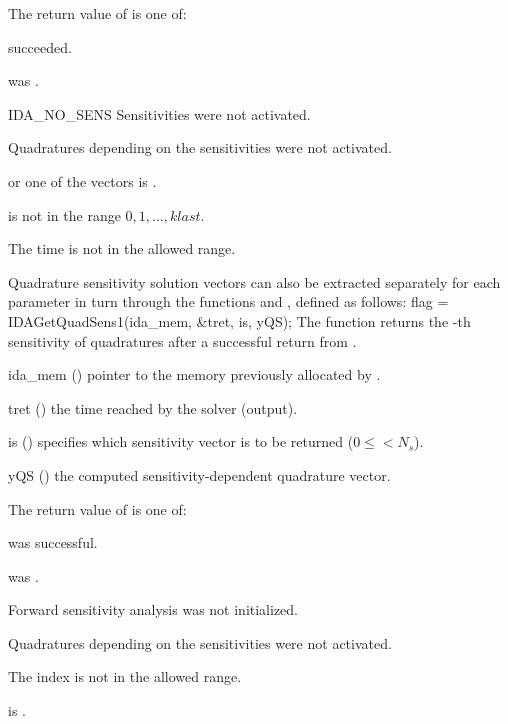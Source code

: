 {
  The return value  of  is one of:
  \begin{args}
  \item[\Id{IDA\_SUCCESS}]
     succeeded.
  \item[\Id{IDA\_MEM\_NULL}]
     was .
  \item[IDA\_NO\_SENS]
    Sensitivities were not activated.
  \item[\Id{IDA\_NO\_QUADSENS}] 
    Quadratures depending on the sensitivities were not activated.
  \item[\Id{IDA\_BAD\_DKY}] 
     or one of the vectors  is .
  \item[\Id{IDA\_BAD\_K}]
     is not in the range $0, 1, ..., klast$.
  \item[\Id{IDA\_BAD\_T}] 
    The time  is not in the allowed range.
  \end{args}
}
{}
Quadrature sensitivity solution vectors can also be extracted separately for 
each parameter in turn through the functions  and
, defined as follows:
{
  flag = IDAGetQuadSens1(ida\_mem, \&tret, is, yQS);
}
{
  The function  returns the -th sensitivity 
  of quadratures after a successful return from .
}
{
  \begin{args}
  \item[ida\_mem] ()
    pointer to the memory previously allocated by .
  \item[tret] ()
    the time reached by the solver (output).
  \item[is] () specifies which sensitivity vector is to be returned
    ($0\le$$< N_s$).
  \item[yQS] ()
    the computed sensitivity-dependent quadrature vector.
  \end{args}
}
{
  The return value  of  is one of:
  \begin{args}
  \item[\Id{IDA\_SUCCESS}]
     was successful.
  \item[\Id{IDA\_MEM\_NULL}] 
     was .
  \item[\Id{IDA\_NO\_SENS}] 
    Forward sensitivity analysis was not initialized.
  \item[\Id{IDA\_NO\_QUADSENS}] 
    Quadratures depending on the sensitivities were not activated.
  \item[\Id{IDA\_BAD\_IS}]
    The index  is not in the allowed range.
  \item[\Id{IDA\_BAD\_DKY}] 
     is .
  \end{args}
}
